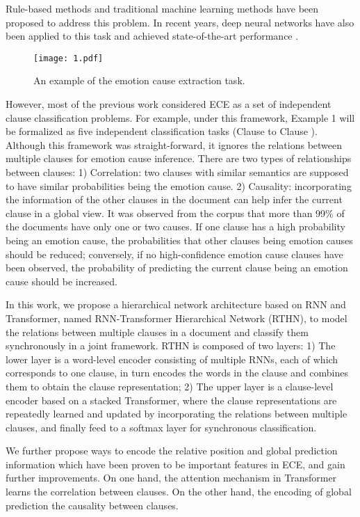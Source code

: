 \documentclass{article}
\begin{document}
Rule-based methods and traditional machine learning methods have been proposed to address this problem. In recent years, deep neural networks have also been applied to this task and achieved state-of-the-art performance \cite{cheng2017emotion,gui2017question,li2018co,ding2019independent,yu2019multiple}.
\begin{figure}[!t]
\centering
\texttt{[image: 1.pdf]}
\caption{An example of the emotion cause extraction task.}
\label{fig_sim1}
\end{figure}

However, most of the previous work considered ECE as a set of independent clause classification problems. For example, under this framework, Example 1 will be formalized as five independent classification tasks (Clause  to Clause ). Although this framework was straight-forward, it ignores the relations between multiple clauses for emotion cause inference. There are two types of relationships between clauses: 1) Correlation: two clauses with similar semantics are supposed to have similar probabilities being the emotion cause. 2) Causality: incorporating the information of the other clauses in the document can help infer the current clause in a global view. It was observed from the corpus \cite{gui2016event} that more than 99\% of the documents have only one or two causes. If one clause has a high probability being an emotion cause, the probabilities that other clauses being emotion causes should be reduced; conversely, if no high-confidence emotion cause clauses have been observed, the probability of predicting the current clause being an emotion cause should be increased.

In this work, we propose a hierarchical network architecture based on RNN and Transformer, named RNN-Transformer Hierarchical Network (RTHN), to model the relations between multiple clauses in a document and classify them synchronously in a joint framework. RTHN is composed of two layers: 1) The lower layer is a word-level encoder consisting of multiple RNNs, each of which corresponds to one clause, in turn encodes the words in the clause and combines them to obtain the clause representation; 2) The upper layer is a clause-level encoder based on a stacked Transformer, where the clause representations are repeatedly learned and updated by incorporating the relations between multiple clauses, and finally feed to a softmax layer for synchronous classification.

We further propose ways to encode the relative position and global prediction information which have been proven to be important features in ECE, and gain further improvements. On one hand, the attention mechanism in Transformer learns the correlation between clauses. On the other hand, the encoding of global prediction the causality between clauses.
\end{document}
